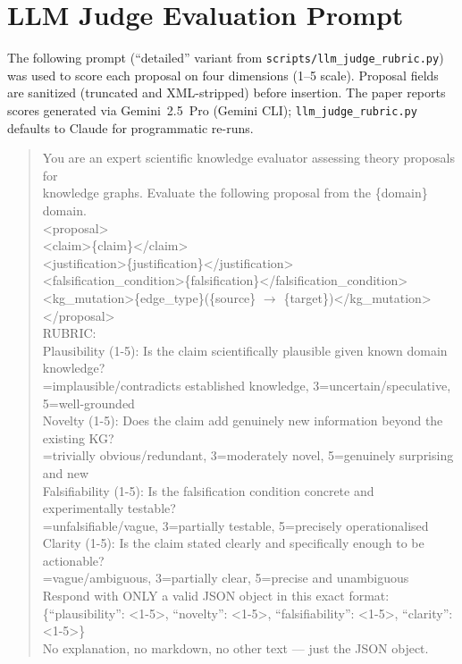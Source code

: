 \section{LLM Judge Evaluation Prompt}\label{app:rubric-prompt}

The following prompt (``detailed'' variant from \texttt{scripts/llm\_judge\_rubric.py})
was used to score each proposal on four dimensions (1--5 scale).  Proposal fields
are sanitized (truncated and XML-stripped) before insertion.  The paper reports
scores generated via Gemini~2.5~Pro (Gemini CLI); \texttt{llm\_judge\_rubric.py}
defaults to Claude for programmatic re-runs.

\begin{quote}\small\ttfamily
You are an expert scientific knowledge evaluator assessing theory proposals for\\
knowledge graphs. Evaluate the following proposal from the \{domain\} domain.\\[4pt]

<proposal>\\
\quad <claim>\{claim\}</claim>\\
\quad <justification>\{justification\}</justification>\\
\quad <falsification\_condition>\{falsification\}</falsification\_condition>\\
\quad <kg\_mutation>\{edge\_type\}(\{source\} $\to$ \{target\})</kg\_mutation>\\
</proposal>\\[4pt]

RUBRIC:\\
Plausibility (1-5): Is the claim scientifically plausible given known domain knowledge?\\
=implausible/contradicts established knowledge, 3=uncertain/speculative, 5=well-grounded\\[2pt]
Novelty (1-5): Does the claim add genuinely new information beyond the existing KG?\\
=trivially obvious/redundant, 3=moderately novel, 5=genuinely surprising and new\\[2pt]
Falsifiability (1-5): Is the falsification condition concrete and experimentally testable?\\
=unfalsifiable/vague, 3=partially testable, 5=precisely operationalised\\[2pt]
Clarity (1-5): Is the claim stated clearly and specifically enough to be actionable?\\
=vague/ambiguous, 3=partially clear, 5=precise and unambiguous\\[4pt]

Respond with ONLY a valid JSON object in this exact format:\\
\{``plausibility'': <1-5>, ``novelty'': <1-5>, ``falsifiability'': <1-5>, ``clarity'': <1-5>\}\\[2pt]
No explanation, no markdown, no other text --- just the JSON object.
\end{quote}

